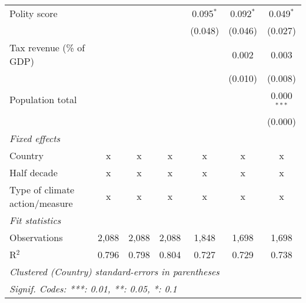 \begin{tabular}{lcccccc}
   Polity score                                                           &              &              &               & 0.095$^{*}$   & 0.092$^{*}$   & 0.049$^{*}$\\   
                                                                          &              &              &               & (0.048)       & (0.046)       & (0.027)\\   
   Tax revenue (\% of GDP)                                                &              &              &               &               & 0.002         & 0.003\\   
                                                                          &              &              &               &               & (0.010)       & (0.008)\\   
   Population total                                                       &              &              &               &               &               & 0.000$^{***}$\\   
                                                                          &              &              &               &               &               & (0.000)\\   
   \emph{Fixed effects}\\
   Country                                                                & x            & x            & x             & x             & x             & x\\  
   Half decade                                                            & x            & x            & x             & x             & x             & x\\  
   Type of climate action/measure                                         & x            & x            & x             & x             & x             & x\\  
   \midrule \emph{Fit statistics}\\
   Observations                                                           & 2,088        & 2,088        & 2,088         & 1,848         & 1,698         & 1,698\\  
   R$^2$                                                                  & 0.796        & 0.798        & 0.804         & 0.727         & 0.729         & 0.738\\  
   \midrule
   \multicolumn{7}{l}{\emph{Clustered (Country) standard-errors in parentheses}}\\
   \multicolumn{7}{l}{\emph{Signif. Codes: ***: 0.01, **: 0.05, *: 0.1}}\\
\end{tabular}
\par\endgroup



